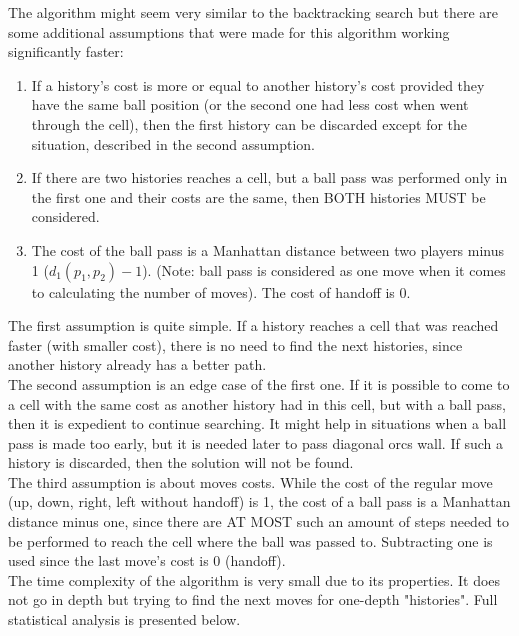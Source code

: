 \documentclass{article}
\begin{document}
The algorithm might seem very similar to the backtracking search but there are some additional assumptions that were made for this algorithm working significantly faster:
\begin{enumerate}
	\item If a history's cost is more or equal to another history's cost provided they have the same ball position (or the second one had less cost when went through the cell), then the first history can be discarded except for the situation, described in the second assumption.
	\item If there are two histories reaches a cell, but a ball pass was performed only in the first one and their costs are the same, then BOTH histories MUST be considered.
	\item The cost of the ball pass is a Manhattan distance between two players minus 1 ($d_1(p_1, p_2) - 1$). (Note: ball pass is considered as one move when it comes to calculating the number of moves). The cost of handoff is 0.
\end{enumerate}
The first assumption is quite simple. If a history reaches a cell that was reached faster (with smaller cost), there is no need to find the next histories, since another history already has a better path.\\
The second assumption is an edge case of the first one. If it is possible to come to a cell with the same cost as another history had in this cell, but with a ball pass, then it is expedient to continue searching. It might help in situations when a ball pass is made too early, but it is needed later to pass diagonal orcs wall. If such a history is discarded, then the solution will not be found.\\
The third assumption is about moves costs. While the cost of the regular move (up, down, right, left without handoff) is 1, the cost of a ball pass is a Manhattan distance minus one, since there are AT MOST such an amount of steps needed to be performed to reach the cell where the ball was passed to. Subtracting one is used since the last move's cost is 0 (handoff).\\
The time complexity of the algorithm is very small due to its properties. It does not go in depth but trying to find the next moves for one-depth "histories". Full statistical analysis is presented below.
\end{document}
